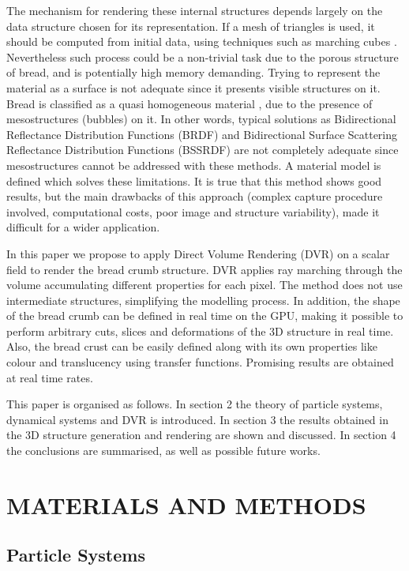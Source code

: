 \documentclass[oneside,a4paper,english,links]{amca}
\begin{document}
The mechanism for rendering these internal structures depends largely on the data structure chosen for its representation. If a mesh of triangles is used, it should be computed from initial data, using techniques such as marching cubes \citep{Lorensen1987}. Nevertheless such process could be a non-trivial task due to the porous structure of bread, and is potentially high memory demanding. Trying to represent the material as a surface is not adequate since it presents visible structures on it. Bread is classified as a quasi homogeneous material \citep{Tong2005}, due to the presence of mesostructures (bubbles) on it. In other words, typical solutions as Bidirectional Reflectance Distribution Functions (BRDF) \citep{Kurt2009} and Bidirectional Surface Scattering Reflectance Distribution Functions (BSSRDF) \citep{Donner2009} are not completely adequate since mesostructures cannot be addressed with these methods. A material model is defined \citep{Tong2005} which solves these limitations. It is true that this method shows good results, but the main drawbacks of this approach (complex capture procedure involved, computational costs, poor image and structure variability), made it difficult for a wider application.

In this paper we propose to apply Direct Volume Rendering (DVR) \citep{Levoy1988,Kruger2003, Kratz2006} on a scalar field to render the bread crumb structure. DVR applies ray marching through the volume accumulating different properties for each pixel. The method does not use intermediate structures, simplifying the modelling process. In addition, the shape of the bread crumb can be defined in real time on the GPU, making it possible to perform arbitrary cuts, slices and deformations of the 3D structure in real time. Also, the bread crust can be easily defined along with its own properties like colour and translucency using transfer functions. Promising results are obtained at real time rates. 

This paper is organised as follows. In section 2 the theory of particle systems, dynamical systems and DVR is introduced. In section 3 the results obtained in the 3D structure generation and rendering are shown and discussed. In section 4 the conclusions are summarised, as well as possible future works.

\section{MATERIALS AND METHODS}

\subsection{Particle Systems}
\end{document}

